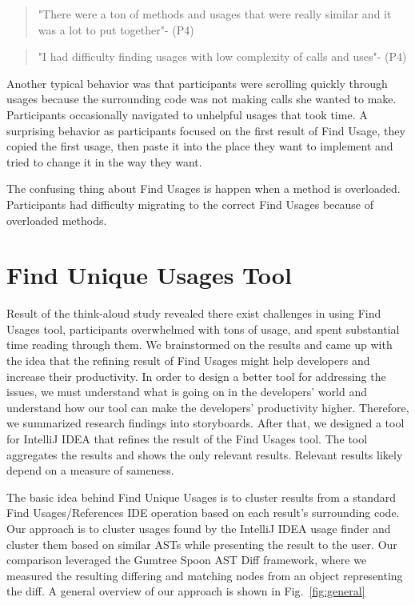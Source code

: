 \documentclass[conference]{IEEEtran}
\begin{document}
\begin{quote}"There were a ton of methods and usages that were really similar and it was a lot to put together"- (P4)\end{quote}
\begin{quote}"I had difficulty finding usages with low complexity of calls and uses"- (P4)\end{quote}

Another typical behavior was that participants were scrolling quickly through usages because the surrounding code was not making calls she wanted to make. Participants occasionally navigated to unhelpful usages that took time. A surprising behavior as participants focused on the first result of Find Usage, they copied the first usage, then paste it into the place they want to implement and tried to change it in the way they want.\par 

The confusing thing about Find Usages is happen when a method is overloaded. Participants had difficulty migrating to the correct Find Usages because of overloaded methods.

\section{Find Unique Usages Tool}
Result of the think-aloud study revealed there exist challenges in using Find Usages tool, participants overwhelmed with tons of usage, and spent substantial time reading through them. We brainstormed on the results and came up with the idea that the refining result of Find Usages might help developers and increase their productivity. In order to design a better tool for addressing the issues, we must understand what is going on in the developers' world and understand how our tool can make the developers' productivity higher. Therefore, we summarized research findings into storyboards. After that, we designed a tool for IntelliJ IDEA that refines the result of the Find Usages tool. The tool aggregates the results and shows the only relevant results. Relevant results likely depend on a measure of sameness.\par
The basic idea behind Find Unique Usages is to cluster results from a standard Find Usages/References IDE operation based on each result's surrounding code. Our approach is to cluster usages found by the IntelliJ IDEA usage finder and cluster them based on similar ASTs while presenting the result to the user. Our comparison leveraged the Gumtree Spoon AST Diff framework, where we measured the resulting differing and matching nodes from an object representing the diff. A general overview of our approach is shown in Fig.~\ref{fig:general} 
\end{document}
